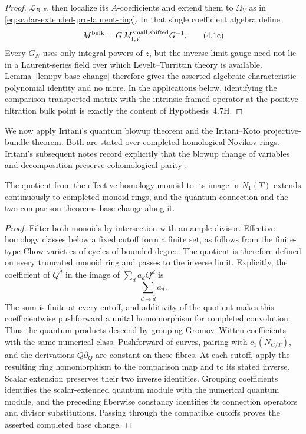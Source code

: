 \begin{proof}
\(\mathscr L_{B,F}\), then localize its \(A\)-coefficients and extend them to
\(\Omega_V\) as in \eqref{eq:scalar-extended-pro-laurent-ring}.  In that
single coefficient algebra define
\[
 M^{\rm bulk}=G\,M_{\mathrm f,V}^{\rm small,shifted}G^{-1}.
 \tag{4.1c}
 \label{eq:pro-laurent-transported-operator}
\]
Every \(G_N\) uses only integral powers of \(z\), but the inverse-limit gauge
need not lie in a Laurent-series field over which Levelt--Turrittin theory is
available.  Lemma~\ref{lem:pv-base-change} therefore gives the asserted
algebraic characteristic-polynomial identity and no more.  In the applications
below, identifying the comparison-transported matrix with the intrinsic framed
operator at the positive-filtration bulk point is exactly the content of
Hypothesis~4.7H.
\end{proof}

We now apply Iritani's quantum blowup theorem and the Iritani--Koto
projective-bundle theorem.  Both are stated over completed homological Novikov
rings.  Iritani's subsequent notes record explicitly that the blowup change
of variables and decomposition preserve cohomological parity
\cite[Section~2]{IritaniNotes}.

\begin{lemma}
\label{lem:numerical-base-change}
The quotient from the effective homology monoid to its image in \(N_1(T)\)
extends continuously to completed monoid rings, and the quantum connection
and the two comparison theorems base-change along it.
\end{lemma}

\begin{proof}
Filter both monoids by intersection with an ample divisor.  Effective homology
classes below a fixed cutoff form a finite set, as follows from the finite-type
Chow varieties of cycles of bounded degree.  The quotient is therefore defined
on every truncated monoid ring and passes to the inverse limit.  Explicitly,
the coefficient of \(Q^{\bar d}\) in the image of \(\sum_da_dQ^d\) is
\[
 \sum_{d\mapsto\bar d}a_d.
\]
The sum is finite at every cutoff, and additivity of the quotient makes this
coefficientwise pushforward a unital homomorphism for completed convolution.
Thus the quantum products descend by grouping Gromov--Witten coefficients with
the same numerical class.  Pushforward of curves, pairing with
\(c_1(N_{C/T})\), and the derivations \(Q\partial_Q\) are constant on these
fibres.  At each cutoff, apply the resulting ring homomorphism to the
comparison map and to its stated inverse.  Scalar extension preserves their
two inverse identities.  Grouping coefficients identifies the scalar-extended
quantum module with the numerical quantum module, and the preceding
fiberwise constancy identifies its connection operators and divisor
substitutions.  Passing through the compatible cutoffs proves the asserted
completed base change.
\end{proof}

